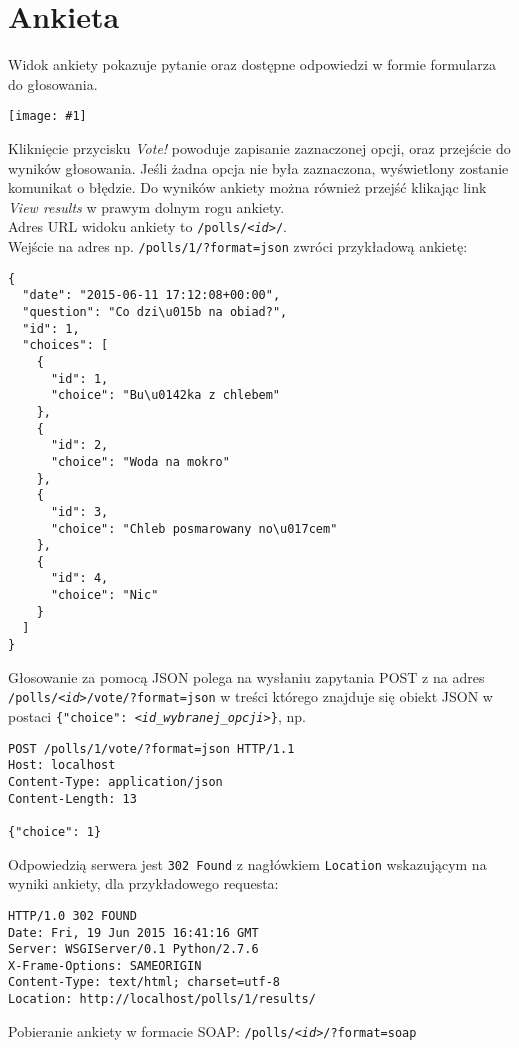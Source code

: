 \documentclass[12pt,a4paper]{article}
\newcommand{\screenshot}[1]{\\\begin{minipage}[c]{\textwidth}\hspace{0em}\texttt{[image: \#1]}\end{minipage}\vspace{0em}}
\newcommand{\json}[1]{\texttt{#1?format=json}}
\newcommand{\soap}[1]{\texttt{#1?format=soap}}
\begin{document}
\section{Ankieta}
Widok ankiety pokazuje pytanie oraz dostępne odpowiedzi w formie formularza do głosowania.
\screenshot{poll.png}
Kliknięcie przycisku \emph{Vote!} powoduje zapisanie zaznaczonej opcji, oraz przejście do wyników głosowania. Jeśli żadna opcja nie była zaznaczona, wyświetlony zostanie komunikat o błędzie. Do wyników ankiety można również przejść klikając link \emph{View results} w prawym dolnym rogu ankiety.\\
Adres URL widoku ankiety to \texttt{/polls/\emph{<id>}/}.\\
Wejście na adres np. \json{/polls/1/} zwróci przykładową ankietę:
\begin{verbatim}
{
  "date": "2015-06-11 17:12:08+00:00",
  "question": "Co dzi\u015b na obiad?",
  "id": 1,
  "choices": [
    {
      "id": 1,
      "choice": "Bu\u0142ka z chlebem"
    },
    {
      "id": 2,
      "choice": "Woda na mokro"
    },
    {
      "id": 3,
      "choice": "Chleb posmarowany no\u017cem"
    },
    {
      "id": 4,
      "choice": "Nic"
    }
  ]
}
\end{verbatim}
Głosowanie za pomocą JSON polega na wysłaniu zapytania POST z na adres \json{/polls/\emph{<id>}/vote/} w treści którego znajduje się obiekt JSON w postaci
\texttt{\{"choice": \emph{<id\_wybranej\_opcji>}\}}, np.
\begin{verbatim}
POST /polls/1/vote/?format=json HTTP/1.1
Host: localhost
Content-Type: application/json
Content-Length: 13

{"choice": 1}
\end{verbatim}
Odpowiedzią serwera jest \texttt{302 Found} z nagłówkiem \texttt{Location} wskazującym na wyniki ankiety, dla przykładowego requesta:
\begin{verbatim}
HTTP/1.0 302 FOUND
Date: Fri, 19 Jun 2015 16:41:16 GMT
Server: WSGIServer/0.1 Python/2.7.6
X-Frame-Options: SAMEORIGIN
Content-Type: text/html; charset=utf-8
Location: http://localhost/polls/1/results/
\end{verbatim}
\vspace{3em}
Pobieranie ankiety w formacie SOAP: \soap{/polls/\emph{<id>}/}
\end{document}
